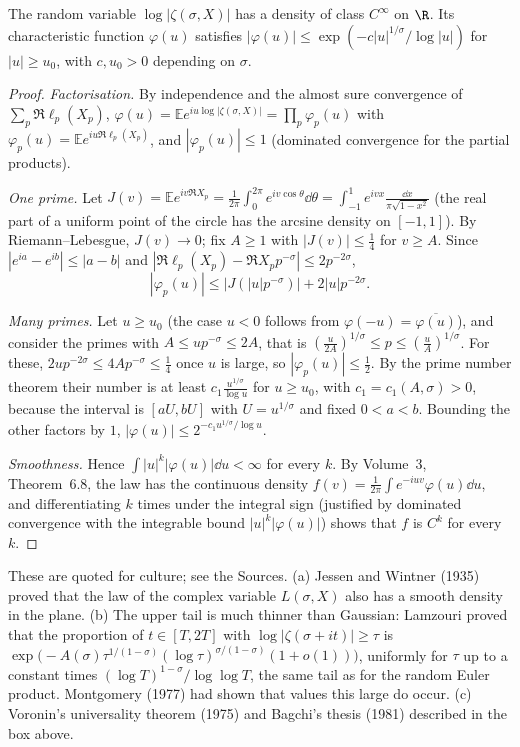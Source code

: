 \begin{theorem}\label{thm:smoothdensity}
The random variable $\log|\zeta(\sigma,X)|$ has a density of class $C^\infty$ on $\R$. Its characteristic function $\varphi(u)$ satisfies $|\varphi(u)|\le\exp(-c|u|^{1/\sigma}/\log|u|)$ for $|u|\ge u_0$, with $c,u_0>0$ depending on $\sigma$.
\end{theorem}
\begin{proof}
\emph{Factorisation.} By independence and the almost sure convergence of $\sum_p\Re\ell_p(X_p)$, $\varphi(u)=\mathbb Ee^{iu\log|\zeta(\sigma,X)|}=\prod_p\varphi_p(u)$ with $\varphi_p(u)=\mathbb Ee^{iu\Re\ell_p(X_p)}$, and $|\varphi_p(u)|\le1$ (dominated convergence for the partial products).

\emph{One prime.} Let $J(v)=\mathbb Ee^{iv\Re X_p}=\frac1{2\pi}\int_0^{2\pi}e^{iv\cos\theta}\dd\theta=\int_{-1}^1e^{ivx}\frac{\dd x}{\pi\sqrt{1-x^2}}$ (the real part of a uniform point of the circle has the arcsine density on $[-1,1]$). By Riemann--Lebesgue, $J(v)\to0$; fix $A\ge1$ with $|J(v)|\le\frac14$ for $v\ge A$. Since $|e^{ia}-e^{ib}|\le|a-b|$ and $|\Re\ell_p(X_p)-\Re X_pp^{-\sigma}|\le2p^{-2\sigma}$,
\[
|\varphi_p(u)|\le|J(|u|p^{-\sigma})|+2|u|p^{-2\sigma}.
\]

\emph{Many primes.} Let $u\ge u_0$ (the case $u<0$ follows from $\varphi(-u)=\overline{\varphi(u)}$), and consider the primes with $A\le up^{-\sigma}\le2A$, that is $(\frac u{2A})^{1/\sigma}\le p\le(\frac uA)^{1/\sigma}$. For these, $2up^{-2\sigma}\le4Ap^{-\sigma}\le\frac14$ once $u$ is large, so $|\varphi_p(u)|\le\frac12$. By the prime number theorem their number is at least $c_1\frac{u^{1/\sigma}}{\log u}$ for $u\ge u_0$, with $c_1=c_1(A,\sigma)>0$, because the interval is $[aU,bU]$ with $U=u^{1/\sigma}$ and fixed $0<a<b$. Bounding the other factors by $1$, $|\varphi(u)|\le2^{-c_1u^{1/\sigma}/\log u}$.

\emph{Smoothness.} Hence $\int|u|^k|\varphi(u)|\dd u<\infty$ for every $k$. By Volume~3, Theorem~6.8, the law has the continuous density $f(v)=\frac1{2\pi}\int e^{-iuv}\varphi(u)\dd u$, and differentiating $k$ times under the integral sign (justified by dominated convergence with the integrable bound $|u|^k|\varphi(u)|$) shows that $f$ is $C^k$ for every $k$.
\end{proof}

\begin{remark}
These are quoted for culture; see the Sources. (a) Jessen and Wintner (1935) proved that the law of the complex variable $L(\sigma,X)$ also has a smooth density in the plane. (b) The upper tail is much thinner than Gaussian: Lamzouri proved that the proportion of $t\in[T,2T]$ with $\log|\zeta(\sigma+it)|\ge\tau$ is $\exp\bigl(-A(\sigma)\tau^{1/(1-\sigma)}(\log\tau)^{\sigma/(1-\sigma)}(1+o(1))\bigr)$, uniformly for $\tau$ up to a constant times $(\log T)^{1-\sigma}/\log\log T$, the same tail as for the random Euler product. Montgomery (1977) had shown that values this large do occur. (c) Voronin's universality theorem (1975) and Bagchi's thesis (1981) described in the box above.
\end{remark}

